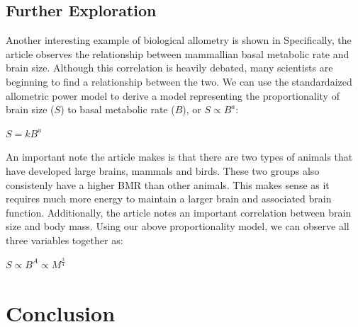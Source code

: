 \documentclass[10pt,letterpaper]{article}
\begin{document}
		\subsection{Further Exploration}
			Another interesting example of biological allometry is shown in %
			Specifically, the article observes the relationship between mammallian basal metabolic rate and brain size. Although this correlation is heavily debated, many scientists are beginning to find a relationship between the two. We can use the standardaized allometric power model to derive a model representing the proportionality of brain size ($S$) to basal metabolic rate ($B$), or $S \propto B^{a}$:
			\newline
			\centerline{$S = kB^{a}$}
			\newline
			An important note the article makes is that there are two types of animals that have developed large brains, mammals and birds. These two groups also consistenly have a higher BMR than other animals. This makes sense as it requires much more energy to maintain a larger brain and associated brain function. 
			\newline \newline
			Additionally, the article notes an important correlation between brain size and body mass. Using our above proportionality model, we can observe all three variables together as:
			\newline
			\centerline{$S \propto B^{A} \propto M^{\frac 3 4}$}

	\section{Conclusion}
		
\end{document}
